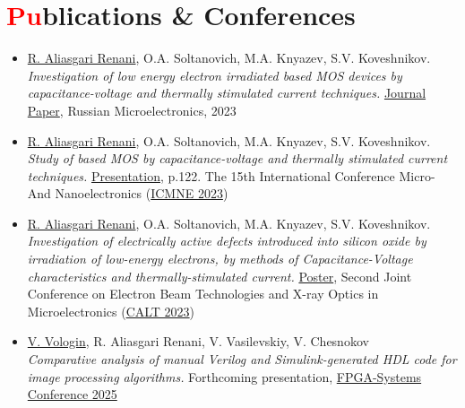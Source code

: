 \documentclass[a4paper, 11pt]{article}
\newcommand{\resumeSubHeadingListStart}{\begin{itemize}[leftmargin=0.0in, label={}]}
\newcommand{\resumeSubHeadingListEnd}{\end{itemize}}
\begin{document}
\section{{\textcolor{red}{Pu}blications} \& Conferences}
\resumeSubHeadingListStart
    \item \underline{R. Aliasgari Renani}, O.A. Soltanovich, M.A. Knyazev, S.V. Koveshnikov. \\ \textit{Investigation of low energy electron irradiated  based MOS devices by capacitance-voltage and thermally stimulated current techniques.} \href{https://doi.org/10.1134/S1063739723600516}{Journal Paper}, Russian Microelectronics, 2023
    \item \underline{R. Aliasgari Renani}, O.A. Soltanovich, M.A. Knyazev, S.V. Koveshnikov. \\ \textit{Study of  based MOS by capacitance-voltage and thermally stimulated current techniques.} \href{https://icmne.ftian.ru/wp-content/uploads/icmne-2023_e-version.pdf}{Presentation}, p.122. The 15th International Conference Micro- And Nanoelectronics (\href{https://icmne.ftian.ru}{ICMNE 2023})
    \item \underline{R. Aliasgari Renani}, O.A. Soltanovich, M.A. Knyazev, S.V. Koveshnikov. \\ \textit{Investigation of electrically active defects introduced into silicon oxide by irradiation of low-energy electrons, by methods of Capacitance-Voltage characteristics and thermally-stimulated current.} \href{https://cebt23.iptm.ru/download/numbered/91.pdf}{Poster}, Second Joint Conference on Electron Beam Technologies and X-ray Optics in Microelectronics (\href{https://cebt23.iptm.ru}{CALT 2023})
    \item \underline{V. Vologin}, R. Aliasgari Renani, V. Vasilevskiy, V. Chesnokov \\ \textit{Comparative analysis of manual Verilog and Simulink-generated HDL code for image processing algorithms.} Forthcoming presentation, \href{https://meetups.yadro.com/fpga-msk-1125/}{FPGA-Systems Conference 2025}
    
\resumeSubHeadingListEnd
\vspace{-15pt}

\end{document}
